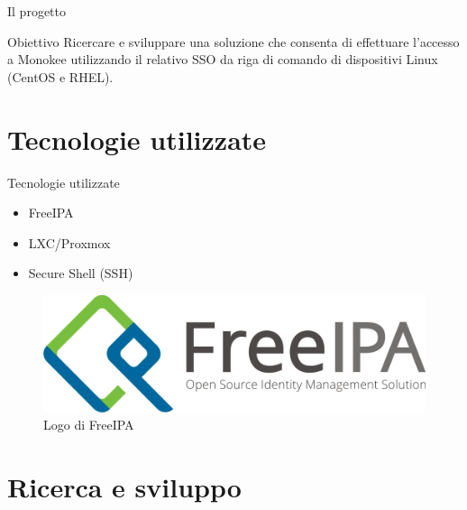 \documentclass{beamer}
\begin{document}
	\begin{frame}{Il progetto}
		\begin{block}{Obiettivo}
			Ricercare e sviluppare una soluzione che consenta di effettuare l'accesso a Monokee utilizzando il relativo SSO da riga di comando di dispositivi Linux (CentOS e RHEL).
		\end{block}
	\end{frame}

	\section{Tecnologie utilizzate}
	
	\begin{frame}{Tecnologie utilizzate}
				
		\begin{itemize}
			\item FreeIPA \vspace{.5em}
			\item LXC/Proxmox \vspace{.5em}
			\item Secure Shell (SSH) \vspace{.5em}
		\end{itemize}
		
		\begin{figure}[H] 
			\centering 
			\includegraphics[width=0.4\columnwidth]{immagini/logo-freeipa.png} 
			\caption{Logo di FreeIPA}
			\label{fig:freeipa}
		\end{figure}
	\end{frame}
	
	\section{Ricerca e sviluppo}
	
\end{document}
